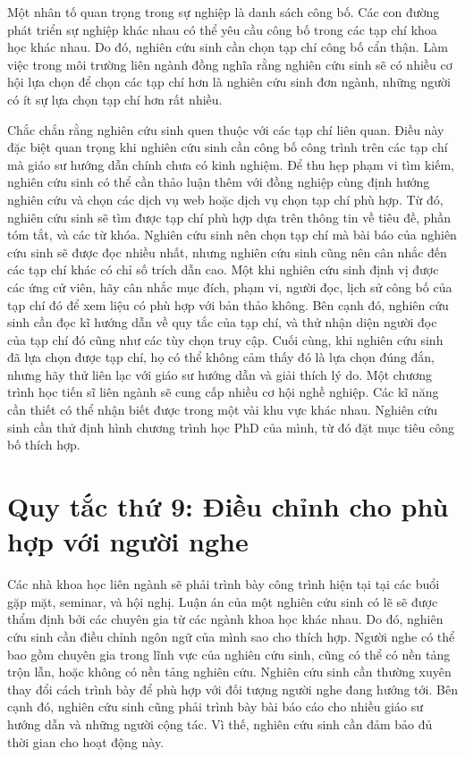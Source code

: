 \documentclass[12pt]{report}
\begin{document}
Một nhân tố quan trọng trong sự nghiệp là danh sách công bố. Các con đường phát triển sự nghiệp khác nhau có thể yêu cầu công bố trong các tạp chí khoa học khác nhau. Do đó, nghiên cứu sinh cần chọn tạp chí công bố cẩn thận. Làm việc trong môi trường liên ngành đồng nghĩa rằng nghiên cứu sinh sẽ có nhiều cơ hội lựa chọn để chọn các tạp chí hơn là nghiên cứu sinh đơn ngành, những người có ít sự lựa chọn tạp chí hơn rất nhiều.

Chắc chắn rằng nghiên cứu sinh quen thuộc với các tạp chí liên quan. Điều này đặc biệt quan trọng khi nghiên cứu sinh cần công bố công trình trên các tạp chí mà giáo sư hướng dẫn chính chưa có kinh nghiệm. Để thu hẹp phạm vi tìm kiếm, nghiên cứu sinh có thể cần thảo luận thêm với đồng nghiệp cùng định hướng nghiên cứu và chọn các dịch vụ web hoặc dịch vụ chọn tạp chí phù hợp. Từ đó, nghiên cứu sinh sẽ tìm được tạp chí phù hợp dựa trên thông tin về tiêu đề, phần tóm tắt, và các từ khóa. Nghiên cứu sinh nên chọn tạp chí mà bài báo của nghiên cứu sinh sẽ được đọc nhiều nhất, nhưng nghiên cứu sinh cũng nên cân nhắc đến các tạp chí khác có chỉ số trích dẫn cao. Một khi nghiên cứu sinh định vị được các ứng cử viên, hãy cân nhắc mục đích, phạm vi, người đọc, lịch sử công bố của tạp chí đó để xem liệu có phù hợp với bản thảo không. Bên cạnh đó, nghiên cứu sinh cần đọc kĩ hướng dẫn về quy tắc của tạp chí, và thử nhận diện người đọc của tạp chí đó cũng như các tùy chọn truy cập. Cuối cùng, khi nghiên cứu sinh đã lựa chọn được tạp chí, họ có thể không cảm thấy đó là lựa chọn đúng đắn, nhưng hãy thử liên lạc với giáo sư hướng dẫn và giải thích lý do. Một chương trình học tiến sĩ liên ngành sẽ cung cấp nhiều cơ hội nghề nghiệp. Các kĩ năng cần thiết có thể nhận biết được trong một vài khu vực khác nhau. Nghiên cứu sinh cần thử định hình chương trình học PhD của mình, từ đó đặt mục tiêu công bố thích hợp.

\section{Quy tắc thứ 9: Điều chỉnh cho phù hợp với người nghe}

Các nhà khoa học liên ngành sẽ phải trình bày công trình hiện tại tại các buổi gặp mặt, seminar, và hội nghị. Luận án của một nghiên cứu sinh có lẽ sẽ được thẩm định bởi các chuyên gia từ các ngành khoa học khác nhau. Do đó, nghiên cứu sinh cần điều chỉnh ngôn ngữ của mình sao cho thích hợp. Người nghe có thể bao gồm chuyên gia trong lĩnh vực của nghiên cứu sinh, cũng có thể có nền tảng trộn lẫn, hoặc không có nền tảng nghiên cứu. Nghiên cứu sinh cần thường xuyên thay đổi cách trình bày để phù hợp với đối tượng người nghe đang hướng tới. Bên cạnh đó, nghiên cứu sinh cũng phải trình bày bài báo cáo cho nhiều giáo sư hướng dẫn và những người cộng tác. Vì thế, nghiên cứu sinh cần đảm bảo đủ thời gian cho hoạt động này.
\end{document}
